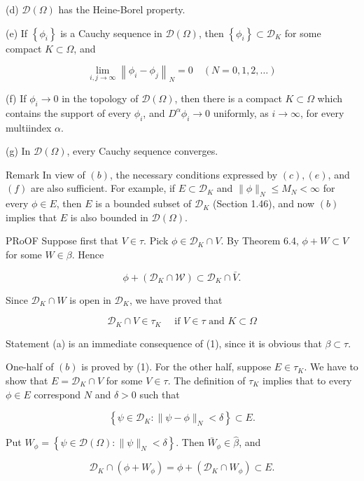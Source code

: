 \documentclass[10pt]{article}
\begin{document}
(d) $\mathscr{D}(\Omega)$ has the Heine-Borel property.

(e) If $\left\{\phi_{i}\right\}$ is a Cauchy sequence in $\mathscr{D}(\Omega)$, then $\left\{\phi_{i}\right\} \subset \mathscr{D}_{K}$ for some compact $K \subset \Omega$, and

$$
\lim _{i, j \rightarrow \infty}\left\|\phi_{i}-\phi_{j}\right\|_{N}=0 \quad(N=0,1,2, \ldots)
$$

(f) If $\phi_{i} \rightarrow 0$ in the topology of $\mathscr{D}(\Omega)$, then there is a compact $K \subset \Omega$ which contains the support of every $\phi_{i}$, and $D^{\alpha} \phi_{i} \rightarrow 0$ uniformly, as $i \rightarrow \infty$, for every multiindex $\alpha$.

(g) In $\mathscr{D}(\Omega)$, every Cauchy sequence converges.

Remark In view of $(b)$, the necessary conditions expressed by $(c),(e)$, and $(f)$ are also sufficient. For example, if $E \subset \mathscr{D}_{K}$ and $\|\phi\|_{N} \leq M_{N}<\infty$ for every $\phi \in E$, then $E$ is a bounded subset of $\mathscr{D}_{K}$ (Section 1.46), and now $(b)$ implies that $E$ is also bounded in $\mathscr{D}(\Omega)$.

PRoOF Suppose first that $V \in \tau$. Pick $\phi \in \mathscr{D}_{K} \cap V$. By Theorem 6.4, $\phi+W \subset V$ for some $W \in \beta$. Hence

$$
\phi+\left(\mathscr{D}_{K} \cap \mathscr{W}\right) \subset \mathscr{D}_{K} \cap \bar{V} .
$$

Since $\mathscr{D}_{K} \cap W$ is open in $\mathscr{D}_{K}$, we have proved that

$$
\mathscr{D}_{K} \cap V \in \tau_{K} \quad \text { if } V \in \tau \text { and } K \subset \Omega
$$

Statement (a) is an immediate consequence of (1), since it is obvious that $\beta \subset \tau$.

One-half of $(b)$ is proved by (1). For the other half, suppose $E \in \tau_{K}$. We have to show that $E=\mathscr{D}_{K} \cap V$ for some $V \in \tau$. The definition of $\tau_{K}$ implies that to every $\phi \in E$ correspond $N$ and $\delta>0$ such that

$$
\left\{\psi \in \mathscr{D}_{K}:\|\psi-\phi\|_{N}<\delta\right\} \subset E .
$$

Put $W_{\phi}=\left\{\psi \in \mathscr{D}(\Omega):\|\psi\|_{N}<\delta\right\}$. Then $\bar{W}_{\phi} \in \hat{\beta}$, and

$$
\mathscr{D}_{K} \cap\left(\phi+W_{\phi}\right)=\phi+\left(\mathscr{D}_{K} \cap W_{\phi}\right) \subset E .
$$
\end{document}
